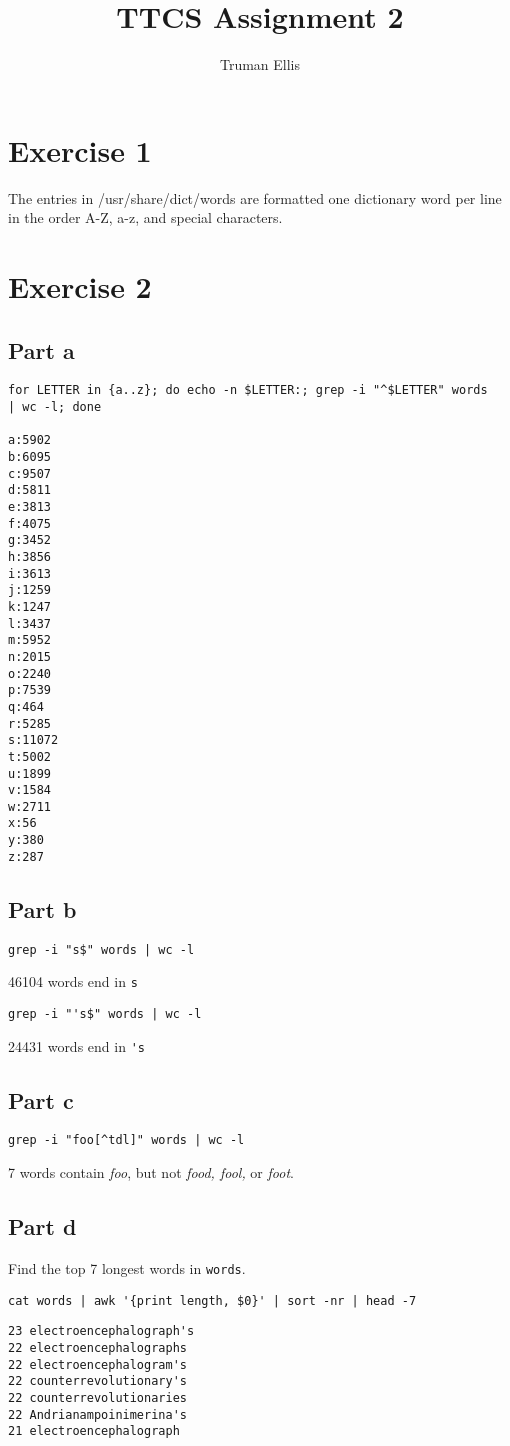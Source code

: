 \documentclass[letterpaper,10pt]{article}
\title{TTCS Assignment 2}
\author{Truman Ellis}
\begin{document}
\maketitle

\section*{Exercise 1}
The entries in /usr/share/dict/words are formatted one dictionary word per line
in the order A-Z, a-z, and special characters.

\section*{Exercise 2}
\subsection*{Part a}
\begin{verbatim}
for LETTER in {a..z}; do echo -n $LETTER:; grep -i "^$LETTER" words
| wc -l; done

a:5902
b:6095
c:9507
d:5811
e:3813
f:4075
g:3452
h:3856
i:3613
j:1259
k:1247
l:3437
m:5952
n:2015
o:2240
p:7539
q:464
r:5285
s:11072
t:5002
u:1899
v:1584
w:2711
x:56
y:380
z:287
\end{verbatim}

\subsection*{Part b}
\verb=grep -i "s$" words | wc -l=

46104 words end in \verb=s=

\verb=grep -i "'s$" words | wc -l=

24431 words end in \verb='s=

\subsection*{Part c}
\verb=grep -i "foo[^tdl]" words | wc -l=

7 words contain \emph{foo}, but not \emph{food, fool,} or \emph{foot}.

\subsection*{Part d}
Find the top 7 longest words in \verb=words=.

\verb=cat words | awk '{print length, $0}' | sort -nr | head -7=
\begin{verbatim}
23 electroencephalograph's
22 electroencephalographs
22 electroencephalogram's
22 counterrevolutionary's
22 counterrevolutionaries
22 Andrianampoinimerina's
21 electroencephalograph
\end{verbatim}
\end{document}
